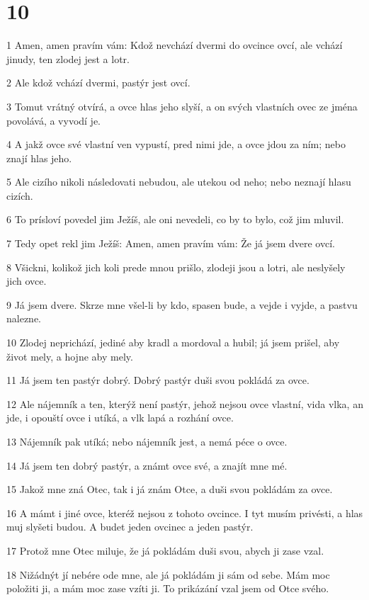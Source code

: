 \chapter{10}

\par 1 Amen, amen pravím vám: Kdož nevchází dvermi do ovcince ovcí, ale vchází jinudy, ten zlodej jest a lotr.
\par 2 Ale kdož vchází dvermi, pastýr jest ovcí.
\par 3 Tomut vrátný otvírá, a ovce hlas jeho slyší, a on svých vlastních ovec ze jména povolává, a vyvodí je.
\par 4 A jakž ovce své vlastní ven vypustí, pred nimi jde, a ovce jdou za ním; nebo znají hlas jeho.
\par 5 Ale cizího nikoli následovati nebudou, ale utekou od neho; nebo neznají hlasu cizích.
\par 6 To prísloví povedel jim Ježíš, ale oni nevedeli, co by to bylo, což jim mluvil.
\par 7 Tedy opet rekl jim Ježíš: Amen, amen pravím vám: Že já jsem dvere ovcí.
\par 8 Všickni, kolikož jich koli prede mnou prišlo, zlodeji jsou a lotri, ale neslyšely jich ovce.
\par 9 Já jsem dvere. Skrze mne všel-li by kdo, spasen bude, a vejde i vyjde, a pastvu nalezne.
\par 10 Zlodej neprichází, jediné aby kradl a mordoval a hubil; já jsem prišel, aby život mely, a hojne aby mely.
\par 11 Já jsem ten pastýr dobrý. Dobrý pastýr duši svou pokládá za ovce.
\par 12 Ale nájemník a ten, kterýž není pastýr, jehož nejsou ovce vlastní, vida vlka, an jde, i opouští ovce i utíká, a vlk lapá a rozhání ovce.
\par 13 Nájemník pak utíká; nebo nájemník jest, a nemá péce o ovce.
\par 14 Já jsem ten dobrý pastýr, a známt ovce své, a znajít mne mé.
\par 15 Jakož mne zná Otec, tak i já znám Otce, a duši svou pokládám za ovce.
\par 16 A mámt i jiné ovce, kteréž nejsou z tohoto ovcince. I tyt musím privésti, a hlas muj slyšeti budou. A budet jeden ovcinec a jeden pastýr.
\par 17 Protož mne Otec miluje, že já pokládám duši svou, abych ji zase vzal.
\par 18 Nižádnýt jí nebére ode mne, ale já pokládám ji sám od sebe. Mám moc položiti ji, a mám moc zase vzíti ji. To prikázání vzal jsem od Otce svého.

